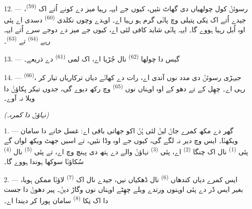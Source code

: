 12. --- رسوئݨ کول چولھیاں دی گھاٹ نئیں، کیوں جے ایہہ رہیا میز دے کونے اُتے اک
 \textsuperscript{(59)}، جیدے اُتے اک نِکی پتیلی وچ پاݨی گرم ہو
رہیا اے۔ اوہدے وچوں نکلدی  \textsuperscript{(60)} دسدی اے پئی اوہ اُبل
رہیا ہووے گا۔ ایہہ پاݨی شاید کافی لئی اے، کیوں جے میز دے دوجے سرے اُتے ایہہ رہے
 \textsuperscript{(64)} تے 
\textsuperscript{(63)}۔

13. --- گیس دا چولھا  \textsuperscript{(62)} نال جُڑیا اے، اک
لمی  \textsuperscript{(61)} دے ذریعے۔

14. ---  \textsuperscript{(66)}، جیہڑی رسوئݨ دی مدد نوں
آندی اے، رات دے کھاݨے دیاں ترکاریاں تیار کر رہی اے۔ چھِل کے تے دھو کے اوہ اوہناں
نوں  \textsuperscript{(65)} وچ رکھ دیوے گی، جدوں تیکر پکاؤݨ دا ویلا نہ
آوے۔

\VUsaut{4.0mm}
{\centering\fontsize{10.2pt}{10.2pt}\selectfont{} \textit{(نہاؤݨ دا کمرہ۔)}\par}
\VUsaut{3.0mm}

1. --- گھر دے مکھ کمرے جاݨ لیݨ لئی ہُݨ اکو جھاتی باقی اے: غسل خانے دا سامان
ویکھݨا۔ ایس وچ دیر نہ لگے گی، کیوں جے اوہ وڈا نئیں، تے اسیں جھٹ ویکھ لواں گے پئی
 \textsuperscript{(1)} نال اک چنگا  \textsuperscript{(2)} اے، پئی  \textsuperscript{(3)} نہاؤݨ
والے دے ہتھ دی پہنچ وچ اے، تے پئی  \textsuperscript{(5)} نال
 \textsuperscript{(4)} سُکاؤݨا سوکھا ہوندا ہووے گا۔

2. --- ایس کمرے دیاں کندھاں  \textsuperscript{(6)} نال ڈھکیاں
نیں، جیدے نال اک  \textsuperscript{(7)} لاؤݨا ممکن ہویا، بغیر ایس ڈر
دے پئی اوہنوں ورتدے ویلے چھِٹے اوہناں نوں وگاڑ دیݨ۔ پیر دھوݨ دا جست دا اک نِکا
 \textsuperscript{(8)} سامان پورا کر دیندا اے۔
\VUsaut{6.0mm}
\VUfilet{22mm}
